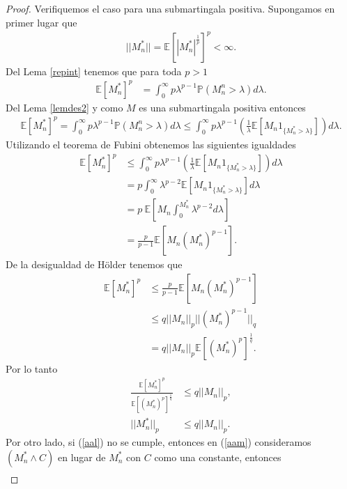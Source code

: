 \begin{proof}
Verifiquemos el caso para una submartingala positiva. Supongamos en primer lugar que
	\begin{align}
	||M_n^{*}|| = \mathbb{E}[|M_n^{*}|^{\frac{1}{p}}]^p < \infty. \label{aal}
	\end{align}
Del Lema \ref{repint} tenemos que para toda $p > 1$
	\begin{align*}
	\mathbb{E}[M_n^{*}]^p & = \int_0^{\infty} p \lambda^{p-1} \mathbb{P}(M_n^{n} > \lambda) d\lambda.
	\end{align*}
Del Lema \ref{lemdes2} y como $M$ es una submartingala positiva entonces
	\begin{align*}
	\mathbb{E}[M_n^{*}]^p = \int_0^{\infty} p \lambda^{p-1} \mathbb{P}(M_n^{n} > \lambda) d\lambda  \leq \int_0^{\infty} p \lambda^{p-1} \left( \frac{1}{\lambda} \mathbb{E}[M_n 1_{\{M_n^{*} > \lambda\}}] \right) d\lambda.
	\end{align*}
Utilizando el teorema de Fubini obtenemos las siguientes igualdades
	\begin{align}
	\mathbb{E}[M_n^{*}]^p & \leq \int_0^{\infty} p \lambda^{p-1} \left( \frac{1}{\lambda} \mathbb{E}[M_n 1_{\{M_n^{*} > \lambda\}} ] \right) d\lambda \nonumber \\
	& = p  \int_0^{\infty} \lambda^{p-2} \mathbb{E}[M_n 1_{\{M_n^{*} > \lambda\}}] d\lambda \nonumber \\
	& = p \ \mathbb{E} \left[ M_n \int_0^{M_n^{*}} \lambda^{p-2} d\lambda \right] \nonumber \\
	& = \frac{p}{p-1} \mathbb{E}[M_n (M_n^{*})^{p-1}]. \label{aam}
	\end{align}
De la desigualdad de Hölder tenemos que
	\begin{align*}
	\mathbb{E}[M_n^{*}]^p & \leq \frac{p}{p-1} \mathbb{E}[M_n (M_n^{*})^{p-1}] \\
	& \leq q ||M_n||_p ||(M_n^{*})^{p-1}||_q \\
	& = q ||M_n||_p \mathbb{E}[(M_n^{*})^p]^{\frac{1}{q}}.
	\end{align*}
Por lo tanto
	\begin{align*}
	\frac{\mathbb{E}[M_n^{*}]^p}{\mathbb{E}[(M_n^{*})^p]^{\frac{1}{q}}} & \leq q ||M_n||_p, \\
	||M_n^{*}||_p & \leq q ||M_n||_p.
	\end{align*}
Por otro lado, si (\ref{aal}) no se cumple, entonces en (\ref{aam}) consideramos $(M_n^{*} \wedge C)$ en lugar de $M_n^{*}$ con $C$ como una constante, entonces
	\begin{align*}

\end{align*}
\end{proof}
